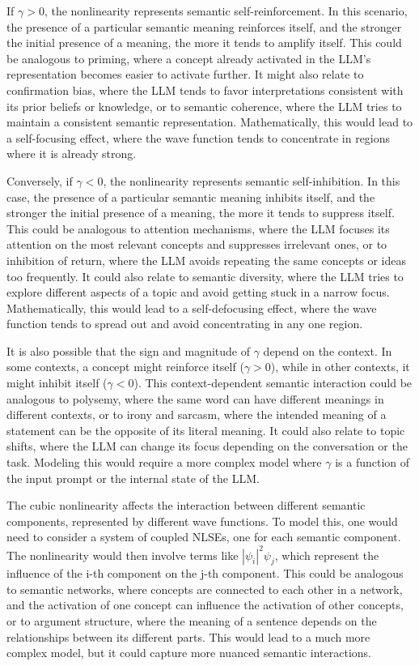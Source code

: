 \documentclass[prd,amsmath,amssymb,12pt]{revtex4}
\begin{document}
If $\gamma > 0$, the nonlinearity represents semantic self-reinforcement. In this scenario, the presence of
a particular semantic meaning reinforces itself, and the stronger the initial presence of a meaning, the more
it tends to amplify itself. This could be analogous to priming, where a concept already activated in the LLM's
representation becomes easier to activate further. It might also relate to confirmation bias, where the LLM tends
to favor interpretations consistent with its prior beliefs or knowledge, or to semantic coherence, where the
LLM tries to maintain a consistent semantic representation. Mathematically, this would lead to a self-focusing effect,
where the wave function tends to concentrate in regions where it is already strong.

Conversely, if $\gamma < 0$, the nonlinearity represents semantic self-inhibition. In this case,
the presence of a particular semantic meaning inhibits itself, and the stronger the initial presence of a meaning,
the more it tends to suppress itself. This could be analogous to attention mechanisms, where the LLM focuses
its attention on the most relevant concepts and suppresses irrelevant ones, or to inhibition of return,
where the LLM avoids repeating the same concepts or ideas too frequently. It could also relate to semantic diversity,
where the LLM tries to explore different aspects of a topic and avoid getting stuck in a narrow focus.
Mathematically, this would lead to a self-defocusing effect, where the wave function tends to spread out and
avoid concentrating in any one region.

It is also possible that the sign and magnitude of $\gamma$ depend on the context. In some contexts, a concept
might reinforce itself ($\gamma > 0$), while in other contexts, it might inhibit itself ($\gamma < 0$).
This context-dependent semantic interaction could be analogous to polysemy, where the same word can have different
meanings in different contexts, or to irony and sarcasm, where the intended meaning of a statement can be
the opposite of its literal meaning. It could also relate to topic shifts, where the LLM can change its focus
depending on the conversation or the task. Modeling this would require a more complex model where $\gamma$ is
a function of the input prompt or the internal state of the LLM.

The cubic nonlinearity affects the interaction between different semantic components, represented by
different wave functions. To model this, one would need to consider a system of coupled NLSEs, one for each
semantic component.
The nonlinearity would then involve terms like $|\psi_i|^2 \psi_j$, which represent the influence of the i-th
component on the j-th component. This could be analogous to semantic networks, where concepts are connected
to each other in a network, and the activation of one concept can influence the activation of other concepts,
or to argument structure, where the meaning of a sentence depends on the relationships between its different parts.
This would lead to a much more complex model, but it could capture more nuanced semantic interactions.
\end{document}
